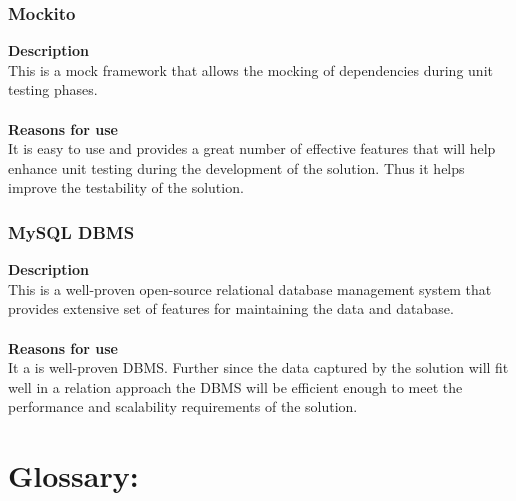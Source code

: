 \documentclass[12pt]{article}
\begin{document}
\subsubsection{Mockito}
\textbf{Description}\\
This is a mock framework that allows the mocking of dependencies during unit testing phases.\\\\
\textbf{Reasons for use}\\
It is easy to use and provides a great number of effective features that will help enhance unit testing during the development of the solution. Thus it helps improve the testability of the solution.

\subsubsection{MySQL DBMS}
\textbf{Description}\\
This is a well-proven open-source relational database management system that provides extensive set of features for maintaining the data and database.\\\\
\textbf{Reasons for use}\\
It a is well-proven DBMS. Further since the data captured by the solution will fit well in a relation approach the DBMS will be efficient enough to meet the performance and scalability requirements of the solution.



\newpage


\newpage
\section{Glossary:}
\vspace{0.2in}
\end{document}
